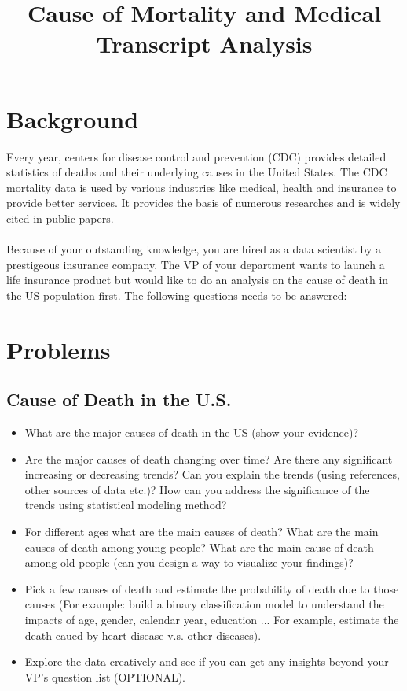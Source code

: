 \documentclass{article}
\title{Cause of Mortality and Medical Transcript Analysis} %
\begin{document}
\maketitle %

\thispagestyle{fancy}
\pagestyle{fancy}

\section{Background}
Every year, centers for disease control and prevention (CDC) provides detailed statistics of deaths and their underlying causes in the United States. The CDC mortality data is used by various industries like medical, health and insurance to provide better services. It provides the basis of numerous researches and is widely cited in public papers.\\\\
Because of your outstanding knowledge, you are hired as a data scientist by a prestigeous insurance company. The VP of your department wants to launch a life insurance product but would like to do an analysis on the cause of death in the US population first. The following questions needs to be answered:

\section{Problems}
\subsection{Cause of Death in the U.S.}
\begin{itemize}
\item What are the major causes of death in the US (show your evidence)?

\item Are the major causes of death changing over time? Are there any significant increasing or decreasing trends? Can you explain the trends (using references, other sources of data etc.)? How can you address the significance of the trends using statistical modeling method?

\item For different ages what are the main causes of death? What are the main causes of death among young people? What are the main cause of death among old people (can you design a way to visualize your findings)?

\item Pick a few causes of death and estimate the probability of death due to those causes (For example: build a binary classification model to understand the impacts of age, gender, calendar year, education ... For example, estimate the death caued by heart disease v.s. other diseases).

\item Explore the data creatively and see if you can get any insights beyond your VP's question list (OPTIONAL).

\end{itemize}
\end{document}
